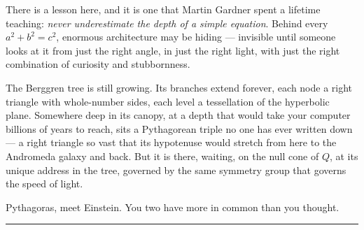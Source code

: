There is a lesson here, and it is one that Martin Gardner spent a lifetime teaching: \emph{never underestimate the depth of a simple equation}. Behind every \(a^2 + b^2 = c^2\), enormous architecture may be hiding --- invisible until someone looks at it from just the right angle, in just the right light, with just the right combination of curiosity and stubbornness.

The Berggren tree is still growing. Its branches extend forever, each node a right triangle with whole-number sides, each level a tessellation of the hyperbolic plane. Somewhere deep in its canopy, at a depth that would take your computer billions of years to reach, sits a Pythagorean triple no one has ever written down --- a right triangle so vast that its hypotenuse would stretch from here to the Andromeda galaxy and back. But it is there, waiting, on the null cone of \(Q\), at its unique address in the tree, governed by the same symmetry group that governs the speed of light.

Pythagoras, meet Einstein. You two have more in common than you thought.

\bigskip\noindent\rule{\linewidth}{0.4pt}\bigskip

